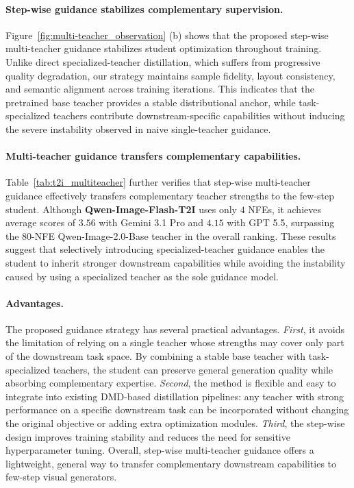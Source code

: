 \documentclass{article}
\begin{document}
\paragraph{Step-wise guidance stabilizes complementary supervision.}
Figure~\ref{fig:multi-teacher_observation} (b) shows that the proposed step-wise multi-teacher guidance stabilizes student optimization throughout training. 
Unlike direct specialized-teacher distillation, which suffers from progressive quality degradation, our strategy maintains sample fidelity, layout consistency, and semantic alignment across training iterations. 
This indicates that the pretrained base teacher provides a stable distributional anchor, while task-specialized teachers contribute downstream-specific capabilities without inducing the severe instability observed in naive single-teacher guidance.


\paragraph{Multi-teacher guidance transfers complementary capabilities.}
Table~\ref{tab:t2i_multiteacher} further verifies that step-wise multi-teacher guidance effectively transfers complementary teacher strengths to the few-step student. Although \textbf{Qwen-Image-Flash-T2I} uses only $4$ NFEs, it achieves average scores of $3.56$ with Gemini 3.1 Pro and $4.15$ with GPT 5.5, surpassing the $80$-NFE Qwen-Image-2.0-Base teacher in the overall ranking. These results suggest that selectively introducing specialized-teacher guidance enables the student to inherit stronger downstream capabilities while avoiding the instability caused by using a specialized teacher as the sole guidance model.

\paragraph{Advantages.}
The proposed guidance strategy has several practical advantages. 
\textit{First}, it avoids the limitation of relying on a single teacher whose strengths may cover only part of the downstream task space. 
By combining a stable base teacher with task-specialized teachers, the student can preserve general generation quality while absorbing complementary expertise. 
\textit{Second}, the method is flexible and easy to integrate into existing DMD-based distillation pipelines: any teacher with strong performance on a specific downstream task can be incorporated without changing the original objective or adding extra optimization modules. 
\textit{Third}, the step-wise design improves training stability and reduces the need for sensitive hyperparameter tuning. Overall, step-wise multi-teacher guidance offers a lightweight, general way to transfer complementary downstream capabilities to few-step visual generators.
\end{document}
